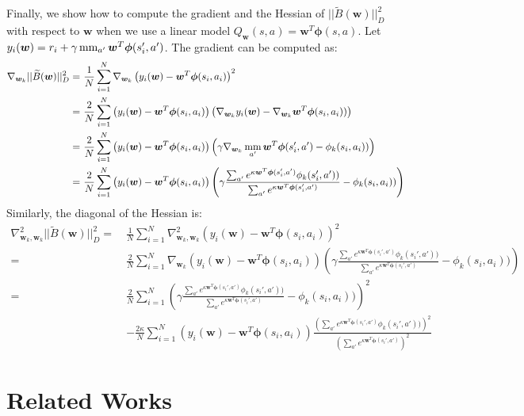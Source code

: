 \documentclass{article}
\newcommand{\mm}{\operatornamewithlimits{mm}}
\begin{document}
Finally, we show how to compute the gradient and the Hessian of $||\widetilde{B}(\bm{w})||_D^2$ with respect to $\bm{w}$ when we use a linear model $Q_{\bm{w}}(s,a) = \bm{w}^T\bm{\phi}(s,a)$. Let $y_i(\bm{w}) = r_i + \gamma\mm_{a'}\bm{w}^T\bm{\phi}(s_i',a')$. The gradient can be computed as:
\begin{align}
\nabla_{\bm{w}_k} ||\widetilde{B}(\bm{w})||_D^2 =\ & 
\frac{1}{N}\sum_{i=1}^N \nabla_{\bm{w}_k} \left( y_i(\bm{w}) - \bm{w}^T\bm{\phi}(s_i,a_i) \right)^2 \\ =\ &
\frac{2}{N}\sum_{i=1}^N \left( y_i(\bm{w}) - \bm{w}^T\bm{\phi}(s_i,a_i) \right)\left( \nabla_{\bm{w}_k}y_i(\bm{w}) - \nabla_{\bm{w}_k}\bm{w}^T\bm{\phi}(s_i,a_i)) \right) \\ =\ &
\frac{2}{N}\sum_{i=1}^N \left( y_i(\bm{w}) - \bm{w}^T\bm{\phi}(s_i,a_i) \right)\left( \gamma\nabla_{\bm{w}_k}\mm_{a'}\bm{w}^T\bm{\phi}(s_i',a') - \phi_k(s_i,a_i)) \right) \\ =\ &
\frac{2}{N}\sum_{i=1}^N \left( y_i(\bm{w}) - \bm{w}^T\bm{\phi}(s_i,a_i) \right)\left( \gamma\frac{\sum_{a'} e^{\kappa \bm{w}^T\bm{\phi}(s_i',a')} \phi_k(s_i',a'))}{\sum_{a'} e^{\kappa \bm{w}^T\bm{\phi}(s_i',a')}} - \phi_k(s_i,a_i)) \right)
\end{align}
Similarly, the diagonal of the Hessian is:
\begin{align}
\nabla_{\bm{w}_k,\bm{w}_k}^2 ||\widetilde{B}(\bm{w})||_D^2 =\ & 
\frac{1}{N}\sum_{i=1}^N \nabla_{\bm{w}_k,\bm{w}_k}^2 \left( y_i(\bm{w}) - \bm{w}^T\bm{\phi}(s_i,a_i) \right)^2 \\ =\ &
\frac{2}{N}\sum_{i=1}^N \nabla_{\bm{w}_k} \left( y_i(\bm{w}) - \bm{w}^T\bm{\phi}(s_i,a_i) \right)\left( \gamma\frac{\sum_{a'} e^{\kappa \bm{w}^T\bm{\phi}(s_i',a')} \phi_k(s_i',a'))}{\sum_{a'} e^{\kappa \bm{w}^T\bm{\phi}(s_i',a')}} - \phi_k(s_i,a_i)) \right) \\ =\ &
\frac{2}{N}\sum_{i=1}^N \left( \gamma\frac{\sum_{a'} e^{\kappa \bm{w}^T\bm{\phi}(s_i',a')} \phi_k(s_i',a'))}{\sum_{a'} e^{\kappa \bm{w}^T\bm{\phi}(s_i',a')}} - \phi_k(s_i,a_i)) \right)^2 \\ \ \ & - \frac{2\kappa}{N}\sum_{i=1}^N \left( y_i(\bm{w}) - \bm{w}^T\bm{\phi}(s_i,a_i) \right) \frac{\left(\sum_{a'} e^{\kappa \bm{w}^T\bm{\phi}(s_i',a')} \phi_k(s_i',a'))\right)^2}{\left(\sum_{a'} e^{\kappa \bm{w}^T\bm{\phi}(s_i',a')}\right)^2}
\end{align}

\section{Related Works}
\end{document}
